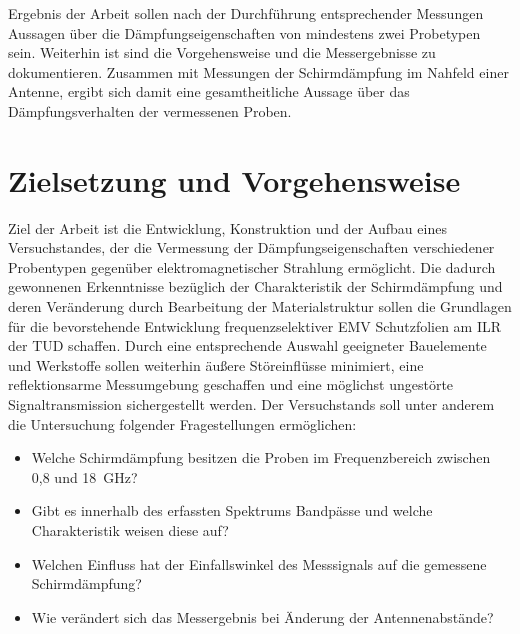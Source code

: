 \par
\vspace{\linespace}
Ergebnis der Arbeit sollen nach der Durchführung entsprechender Messungen Aussagen über die Dämpfungseigenschaften von mindestens zwei Probetypen sein. Weiterhin ist sind die Vorgehensweise und die Messergebnisse zu dokumentieren. Zusammen mit Messungen der Schirmdämpfung im Nahfeld einer Antenne, ergibt sich damit eine gesamtheitliche Aussage über das Dämpfungsverhalten der vermessenen Proben.



\chapter{Zielsetzung und Vorgehensweise}

Ziel der Arbeit ist die Entwicklung, Konstruktion und der Aufbau eines Versuchstandes, der die Vermessung der Dämpfungseigenschaften verschiedener Probentypen gegenüber elektromagnetischer Strahlung ermöglicht. Die dadurch gewonnenen Erkenntnisse bezüglich der Charakteristik der Schirmdämpfung und deren Veränderung durch Bearbeitung der Materialstruktur sollen die Grundlagen für die bevorstehende Entwicklung frequenzselektiver EMV Schutzfolien am ILR der TUD schaffen. Durch eine entsprechende Auswahl geeigneter Bauelemente und Werkstoffe sollen weiterhin äußere Störeinflüsse minimiert, eine reflektionsarme Messumgebung geschaffen und eine möglichst ungestörte Signaltransmission sichergestellt werden. Der Versuchstands soll unter anderem die Untersuchung folgender Fragestellungen ermöglichen:

\renewcommand\labelitemi{$\vcenter{\hbox{\small$\bullet$}}$}
\begin{itemize}
    \item Welche Schirmdämpfung besitzen die Proben im Frequenzbereich zwischen 0,8 und \SI{18}{\giga\hertz}?
    \item Gibt es innerhalb des erfassten Spektrums Bandpässe und welche Charakteristik weisen diese auf?
    \item Welchen Einfluss hat der Einfallswinkel des Messsignals auf die gemessene Schirmdämpfung?
    \item Wie verändert sich das Messergebnis bei Änderung der Antennenabstände?
\end{itemize}

